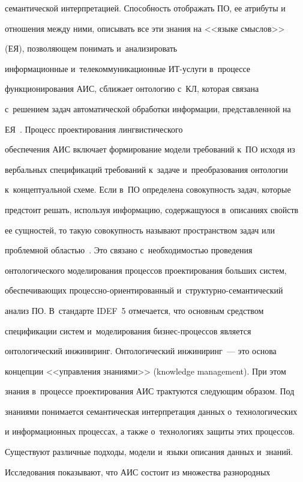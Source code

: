 семантической интерпретацией. Способность отображать ПО, ее атрибуты и~


отношения между ними, описывать все эти знания на <<языке смыслов>> 


(ЕЯ), позволяющем понимать и~анализировать 


информационные и~телекоммуникационные ИТ-услуги в~процессе 


функционирования АИС, сближает онтологию с~КЛ, которая связана 


с~решением задач автоматической обработки информации, представленной на 


ЕЯ~\cite{17-rod}. Процесс проектирования лингвистического 


обеспечения АИС включает формирование модели требований к~ПО исходя из 


вербальных спецификаций требований к~задаче и~преобразования онтологии 


к~концептуальной схеме. Если в~ПО определена совокупность задач, которые 


предстоит решать, используя информацию, содержащуюся в~описаниях свойств 


ее сущностей, то такую совокупность называют пространством задач или 


проблемной областью~\cite{18-rod}. Это связано с~необходимостью проведения 


онтологического моделирования процессов проектирования больших систем, 


обеспечивающих процессно-ориентированный и~структурно-семантический 


анализ ПО. В~стандарте IDEF~5 отмечается, что основным средством 


спецификации систем и~моделирования биз\-нес-про\-цес\-сов является 


онтологический инжиниринг. Онтологический инжиниринг~--- это основа 


концепции <<управ\-ле\-ния знаниями>> (knowledge management). При этом 


знания в~процессе проектирования АИС трактуются следующим образом. Под 


знаниями понимается семантическая интерпретация данных о~технологических 


и информационных процессах, а также о~технологиях защиты этих процессов. 


Существуют различные подходы, модели и~языки описания данных и~знаний. 


Исследования показывают, что АИС состоит из множества разнородных 


